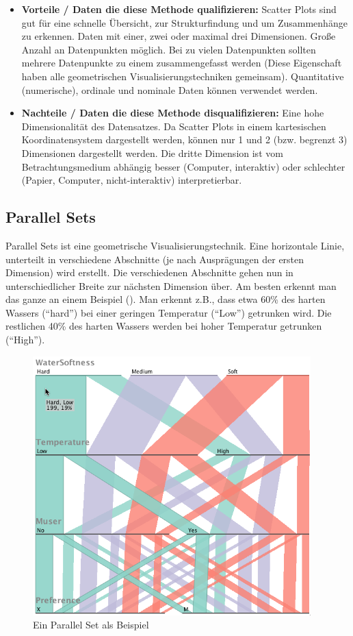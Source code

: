 \documentclass[a4paper,12pt,ngerman]{scrartcl}
\begin{document}
\begin{itemize}
	\item \textbf{Vorteile / Daten die diese Methode qualifizieren:}
	Scatter Plots sind gut für eine schnelle Übersicht, zur Strukturfindung und um Zusammenhänge zu erkennen. Daten mit einer, zwei oder maximal drei Dimensionen. Große Anzahl an Datenpunkten möglich. Bei zu vielen Datenpunkten sollten mehrere Datenpunkte zu einem zusammengefasst werden (Diese Eigenschaft haben alle geometrischen Visualisierungstechniken gemeinsam). Quantitative (numerische), ordinale und nominale Daten können verwendet werden.

	\item \textbf{Nachteile / Daten die diese Methode disqualifizieren:}
	Eine hohe Dimensionalität des Datensatzes. Da Scatter Plots in einem kartesischen Koordinatensystem dargestellt werden, können nur 1 und 2 (bzw. begrenzt 3) Dimensionen dargestellt werden. Die dritte Dimension ist vom Betrachtungsmedium abhängig besser (Computer, interaktiv) oder schlechter (Papier, Computer, nicht-interaktiv) interpretierbar.
\end{itemize}

\subsection*{Parallel Sets}
Parallel Sets ist eine geometrische Visualisierungstechnik. Eine horizontale Linie, unterteilt in verschiedene Abschnitte (je nach Ausprägungen der ersten Dimension) wird erstellt. Die verschiedenen Abschnitte gehen nun in unterschiedlicher Breite zur nächsten Dimension über. Am besten erkennt man das ganze an einem Beispiel (). Man erkennt z.B., dass etwa 60\% des harten Wassers (\enquote{hard}) bei einer geringen Temperatur (\enquote{Low}) getrunken wird. Die restlichen 40\% des harten Wassers werden bei hoher Temperatur getrunken (\enquote{High}).

\begin{figure}[ht]
    \centering
    \includegraphics[height=10cm]{includes/parallel-sets}
    \caption{Ein Parallel Set als Beispiel}
    \label{fig:parallel-sets}
\end{figure}
\end{document}

